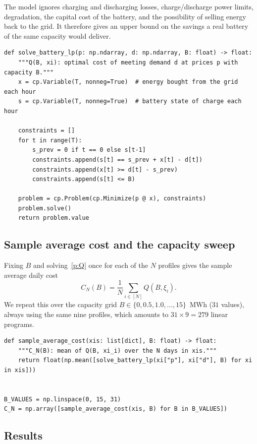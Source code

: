The model ignores charging and discharging losses, charge/discharge power limits,
degradation, the capital cost of the battery, and the possibility of selling energy
back to the grid. It therefore gives an upper bound on the savings a real battery
of the same capacity would deliver.

\begin{lstlisting}
def solve_battery_lp(p: np.ndarray, d: np.ndarray, B: float) -> float:
    """Q(B, xi): optimal cost of meeting demand d at prices p with capacity B."""
    x = cp.Variable(T, nonneg=True)  # energy bought from the grid each hour
    s = cp.Variable(T, nonneg=True)  # battery state of charge each hour

    constraints = []
    for t in range(T):
        s_prev = 0 if t == 0 else s[t-1]
        constraints.append(s[t] == s_prev + x[t] - d[t])
        constraints.append(x[t] >= d[t] - s_prev)
        constraints.append(s[t] <= B)

    problem = cp.Problem(cp.Minimize(p @ x), constraints)
    problem.solve()
    return problem.value
\end{lstlisting}

\subsection{Sample average cost and the capacity sweep}

Fixing $B$ and solving~\eqref{p:Q} once for each of the $N$ profiles gives the
sample average daily cost
\begin{equation}
    C_N(B) = \frac{1}{N}\sum_{i\in[N]} Q(B,\xi_i).
\end{equation}
We repeat this over the capacity grid $B \in \{0, 0.5, 1.0, \dots, 15\}$~MWh
($31$ values), always using the same nine profiles, which amounts to
$31\times 9 = 279$ linear programs.

\begin{lstlisting}
def sample_average_cost(xis: list[dict], B: float) -> float:
    """C_N(B): mean of Q(B, xi_i) over the N days in xis."""
    return float(np.mean([solve_battery_lp(xi["p"], xi["d"], B) for xi in xis]))


B_VALUES = np.linspace(0, 15, 31)
C_N = np.array([sample_average_cost(xis, B) for B in B_VALUES])
\end{lstlisting}

\subsection{Results}

